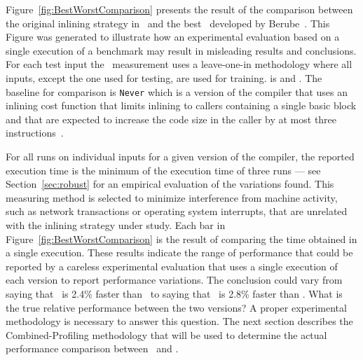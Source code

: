 Figure~\ref{fig:BestWorstComparison}  presents the result of the comparison between the original inlining strategy in \llvm\ and the best \FDI\ developed by Berube~\cite{BerubePhD}. This Figure was generated to illustrate how an experimental evaluation based on a single execution of a benchmark may result in misleading results and conclusions. For each test input the \FDI\ measurement uses a leave-one-in methodology where all inputs, except the one used for testing, are used for training. is and \llvm. The baseline for comparison is  {\tt Never} which is a version of the compiler that uses an inlining cost function that limits inlining to callers containing a single basic block and that are expected to increase the code size in the caller by at most three instructions~\cite{BerubePhD}.

For all runs on individual inputs for a given version of the compiler, the reported execution time is the minimum of the execution time of three runs --- see Section~\ref{sec:robust} for an empirical evaluation of the variations found. This measuring method is selected to minimize interference from machine activity, such as network transactions or operating system interrupts, that are unrelated with the inlining strategy under study.  Each bar in Figure~\ref{fig:BestWorstComparison} is the result of comparing the time obtained in a single execution. These results indicate the range of performance that could be reported by a careless experimental evaluation that uses a single execution of each version to report performance variations. The conclusion could vary from saying that \FDI\ is 2.4\% faster than \llvm\ to saying that \llvm\ is 2.8\% faster than \FDI. What is the true relative performance between the two versions? A proper experimental methodology is necessary to answer this question. The next section describes the Combined-Profiling methodology that will be used to determine the actual performance comparison between \FDI\ and \llvm.
 
